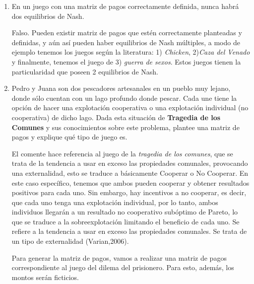 \documentclass{exam}
\begin{document}
\begin{enumerate}[label=(\alph*)]
    \item En un juego con una matriz de pagos correctamente definida, nunca habrá dos equilibrios de Nash.
    \begin{solution}
    Falso. Pueden existir matriz de pagos que estén correctamente planteadas y definidas, y aún así pueden haber equilibrios de Nash múltiples, a modo de ejemplo tenemos los juegos según la literatura: 1) \textit{Chicken}, 2)\textit{Caza del Venado} y finalmente, tenemos el juego de 3) \textit{guerra de sexos}. Estos juegos tienen la particularidad que poseen 2 equilibrios de Nash. 
    \end{solution}
    
    \item Pedro y Juana son dos pescadores artesanales en un pueblo muy lejano, donde sólo cuentan con un lago profundo donde pescar. Cada une tiene la opción de hacer una explotación cooperativa o una explotación individual (no cooperativa) de dicho lago. Dada esta situación de \textbf{Tragedia de los Comunes} y sus conocimientos sobre este problema, plantee una matriz de pagos y explique qué tipo de juego es.
    \begin{solution}
    El comente hace referencia al juego de la \textit{tragedia de los comunes}, que se trata de la tendencia a usar en exceso las propiedades comunales, provocando una externalidad, esto se traduce a básicamente Cooperar o No Cooperar. En este caso específico, tenemos que ambos pueden cooperar y obtener resultados positivos para cada uno. Sin embargo, hay incentivos a no cooperar, es decir, que cada uno tenga una explotación individual, por lo tanto, ambos individuos llegarán a un resultado no cooperativo subóptimo de Pareto, lo que se traduce a la sobreexplotación limitando el beneficio de cada uno. Se refiere a la tendencia a usar en exceso las propiedades comunales. Se trata de un tipo de externalidad (Varian,2006).
    
    Para generar la matriz de pagos, vamos a realizar una matriz de pagos correspondiente al juego del dilema del prisionero. 
    Para esto, además, los montos serán ficticios. 
    
    
  \begin{center}

\end{center}
\end{solution}
\end{enumerate}
\end{document}
